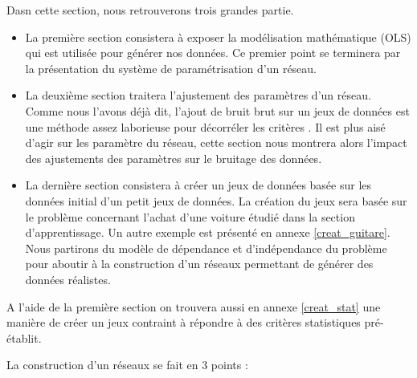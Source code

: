 \documentclass[a4paper]{article}
\begin{document}
Dasn cette section, nous retrouverons trois grandes partie.
\begin{itemize}
\item La première section consistera à exposer la modélisation mathématique (OLS) qui est utilisée pour générer nos données.
Ce premier point se terminera par la présentation du système de paramétrisation d'un réseau.

\item La deuxième section traitera l'ajustement des paramètres d'un réseau. Comme nous l'avons déjà dit, l'ajout de bruit brut sur un jeux de données est une méthode assez  laborieuse pour décorréler les critères . Il est plus aisé d'agir sur les paramètre du réseau, cette section nous montrera alors l'impact des ajustements des  paramètres sur le bruitage des données.


\item La dernière section consistera à créer un jeux de données basée sur les données initial d'un petit jeux de données. 
La création du jeux sera basée sur le problème concernant l'achat d'une voiture étudié dans la section d'apprentissage.
Un autre exemple est présenté en annexe \ref{creat_guitare}.
Nous partirons du modèle de dépendance et d'indépendance du problème pour aboutir à la construction d'un réseaux permettant de générer des données réalistes. 

\end{itemize}

A l'aide de la première section on trouvera aussi   en annexe \ref{creat_stat} une manière de créer un jeux contraint à répondre à des critères statistiques pré-établit.

La construction d'un réseaux se fait en 3 points :
\end{document}
